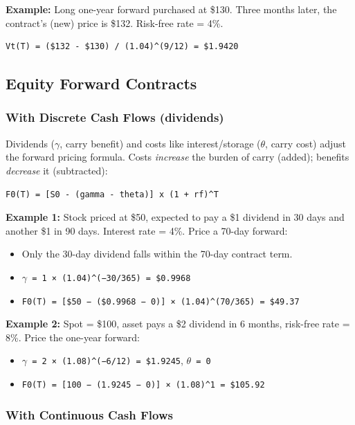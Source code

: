\documentclass[12pt,openany]{book}
\theoremstyle{definition}
\theoremstyle{remark}
\begin{document}
\textbf{Example:} Long one-year forward purchased at \$130. Three months later, the contract's (new) price is \$132. Risk-free rate = 4\%.
\begin{lstlisting}[style=notesCode]
Vt(T) = ($132 - $130) / (1.04)^(9/12) = $1.9420
\end{lstlisting}

\subsection{Equity Forward Contracts}

\subsubsection{With Discrete Cash Flows (dividends)}

Dividends (\textbf{\ensuremath{\gamma}}, carry benefit) and costs like interest/storage (\textbf{\ensuremath{\theta}}, carry cost) adjust the forward pricing formula. Costs \emph{increase} the burden of carry (added); benefits \emph{decrease} it (subtracted):

\begin{lstlisting}[style=notesCode]
F0(T) = [S0 - (gamma - theta)] x (1 + rf)^T
\end{lstlisting}

\textbf{Example 1:} Stock priced at \$50, expected to pay a \$1 dividend in 30 days and another \$1 in 90 days. Interest rate = 4\%. Price a 70-day forward:
\begin{itemize}
\item Only the 30-day dividend falls within the 70-day contract term.
\item \texttt{\ensuremath{\gamma} = 1 × (1.04)\textasciicircum{}(−30/365) = \$0.9968}
\item \texttt{F0(T) = [\$50 − (\$0.9968 − 0)] × (1.04)\textasciicircum{}(70/365) = \$49.37}
\end{itemize}
\textbf{Example 2:} Spot = \$100, asset pays a \$2 dividend in 6 months, risk-free rate = 8\%. Price the one-year forward:
\begin{itemize}
\item \texttt{\ensuremath{\gamma} = 2 × (1.08)\textasciicircum{}(−6/12) = \$1.9245}, \texttt{\ensuremath{\theta} = 0}
\item \texttt{F0(T) = [100 − (1.9245 − 0)] × (1.08)\textasciicircum{}1 = \$105.92}
\end{itemize}
\subsubsection{With Continuous Cash Flows}
\end{document}
